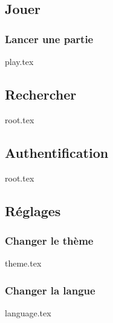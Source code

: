 \subsection{Jouer}
\subsubsection{Lancer une partie}
{play.tex}

\subsection{Rechercher}
{root.tex}

\subsection{Authentification}
{root.tex}

\subsection{Réglages}
\subsubsection{Changer le thème}
{theme.tex}

\subsubsection{Changer la langue}
{language.tex}